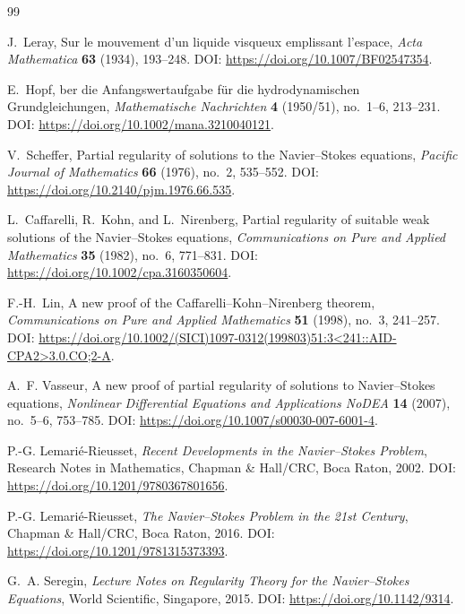 \documentclass[11pt]{article}
\numberwithin{equation}{section}
\begin{document}
\begin{thebibliography}{99}

J.~Leray,
\newblock Sur le mouvement d'un liquide visqueux emplissant l'espace,
\newblock \emph{Acta Mathematica} \textbf{63} (1934), 193--248.
\newblock DOI: \url{https://doi.org/10.1007/BF02547354}.

E.~Hopf,
ber die Anfangswertaufgabe f{\"u}r die hydrodynamischen Grundgleichungen,
\newblock \emph{Mathematische Nachrichten} \textbf{4} (1950/51), no.~1--6, 213--231.
\newblock DOI: \url{https://doi.org/10.1002/mana.3210040121}.

V.~Scheffer,
\newblock Partial regularity of solutions to the Navier--Stokes equations,
\newblock \emph{Pacific Journal of Mathematics} \textbf{66} (1976), no.~2, 535--552.
\newblock DOI: \url{https://doi.org/10.2140/pjm.1976.66.535}.

L.~Caffarelli, R.~Kohn, and L.~Nirenberg,
\newblock Partial regularity of suitable weak solutions of the Navier--Stokes equations,
\newblock \emph{Communications on Pure and Applied Mathematics} \textbf{35} (1982), no.~6, 771--831.
\newblock DOI: \url{https://doi.org/10.1002/cpa.3160350604}.

F.-H.~Lin,
\newblock A new proof of the Caffarelli--Kohn--Nirenberg theorem,
\newblock \emph{Communications on Pure and Applied Mathematics} \textbf{51} (1998), no.~3, 241--257.
\newblock DOI: \url{https://doi.org/10.1002/(SICI)1097-0312(199803)51:3<241::AID-CPA2>3.0.CO;2-A}.

A.~F. Vasseur,
\newblock A new proof of partial regularity of solutions to Navier--Stokes equations,
\newblock \emph{Nonlinear Differential Equations and Applications NoDEA} \textbf{14} (2007), no.~5--6, 753--785.
\newblock DOI: \url{https://doi.org/10.1007/s00030-007-6001-4}.

P.-G. Lemari\'e-Rieusset,
\newblock \emph{Recent Developments in the Navier--Stokes Problem},
\newblock Research Notes in Mathematics, Chapman \& Hall/CRC, Boca Raton, 2002.
\newblock DOI: \url{https://doi.org/10.1201/9780367801656}.

P.-G. Lemari\'e-Rieusset,
\newblock \emph{The Navier--Stokes Problem in the 21st Century},
\newblock Chapman \& Hall/CRC, Boca Raton, 2016.
\newblock DOI: \url{https://doi.org/10.1201/9781315373393}.

G.~A. Seregin,
\newblock \emph{Lecture Notes on Regularity Theory for the Navier--Stokes Equations},
\newblock World Scientific, Singapore, 2015.
\newblock DOI: \url{https://doi.org/10.1142/9314}.


\end{thebibliography}
\end{document}
